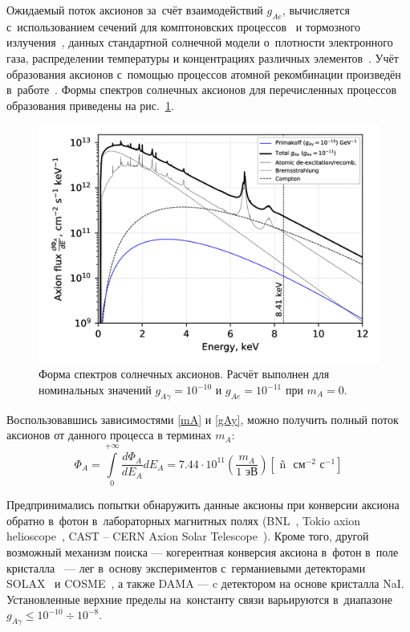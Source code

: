 \documentclass[a4paper,article,14pt]{extarticle}
\begin{document}
Ожидаемый поток аксионов за~счёт взаимодействий $g_{Ae}$, вычисляется с~использованием сечений для комптоновских процессов~\cite{pospelov2008bosonic,gondolo2009solar} и тормозного излучения~\cite{brem}, данных стандартной солнечной модели о~плотности электронного газа, распределении температуры и концентрациях различных элементов~\cite{kekez2009search,derbin2011constraints}. Учёт образования аксионов с~помощью процессов атомной рекомбинации произведён в~работе~\cite{redondo2013solar}.
Формы спектров солнечных аксионов для перечисленных процессов образования приведены на рис.~\ref{fig:flux}.
\begin{figure}[t]
    \centering
    \includegraphics[width = .9\textwidth]{images/flux_solar.png}
    \caption{Форма спектров солнечных аксионов. Расчёт выполнен для номинальных значений $g_{A\gamma} = 10^{-10}$ и $g_{Ae} = 10^{-11}$ при $m_A = 0$.}\label{fig:flux}
\end{figure}
Воспользовавшись зависимостями \eqref{mA} и \eqref{gAy}, можно получить полный поток аксионов от данного процесса в терминах $m_A$:
\begin{equation}
 {\Phi _A} = \int\limits_0^{ + \infty } {\frac{{d{\Phi _A}}}{{d{E_A}}}d{E_A} } = 7.44 \cdot {10^{11}}\left( {\frac{{{m_A}}}{{1{\text{ эВ}}}}} \right)\left[ {{\text{ \~n }}{{\text{ см}}^{ - 2}}{{\text{ с}}^{ - 1}}} \right]
\end{equation}

Предпринимались попытки обнаружить данные аксионы при конверсии аксиона обратно в~фотон в~лабораторных магнитных полях (BNL~\cite{lazarus1992search}, Tokio axion helioscope~\cite{moriyama1998direct,inoue2002search}, CAST -- CERN Axion Solar Telescope~\cite{beltran2005search}).
Кроме того, другой возможный механизм поиска --- когерентная конверсия аксиона в~фотон в~поле кристалла~\cite{paschos1994proposal} --- лег в~основу экспериментов с~германиевыми детекторами SOLAX~\cite{avignone1998first, avignone1999solar} и COSME~\cite{scopel1998theoretical,morales2002particle}, а также DAMA \cite{bernabei2001search} --- c детектором на основе кристалла NaI.
Установленные верхние пределы на~константу связи варьируются в~диапазоне $g_{A \gamma} \leqslant 10^{-10} \div 10^{-8}$.
\end{document}
